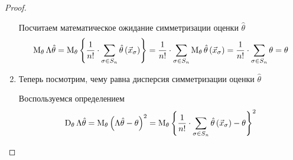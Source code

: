\begin{proof}
\begin{enumerate}
      Посчитаем математическое ожидание симметризации оценки $\hat{\theta}$
      \begin{align*}
        \operatorname{M}_{\theta} \Lambda\hat{\theta}
        = \operatorname{M}_{\theta} \left\{\frac{1}{n!}\cdot \sum_{\sigma\in S_n}
          \hat{\theta}\left( \vec{x}_{\sigma} \right)\right\}
        = \frac{1}{n!} \cdot \sum_{\sigma \in S_n}
          \operatorname{M}_{\theta} \hat{\theta}
            \left( \vec{x}_{\sigma} \right)
        = \frac{1}{n!} \cdot \sum_{\sigma \in S_n} \theta
        = \theta
      \end{align*}
      \begin{comment}
      Помним, что математическое ожидание линейно и
      константы можно выносить за знак математического ожидания,
      а математическое ожидание суммы равно сумме математических ожиданий
      \begin{align*}
          \meanof{\theta}{\left\{\frac{1}{n!}\cdot \sum_{\sigma\in S_n}
        \hat{\theta}\left(\vec{x}_\sigma\right)\right\}}
        = \frac{1}{n!}\cdot \sum_{\sigma\in S_n}
            \meanof{\theta}{\hat{\theta}\left(\vec{x}_\sigma\right)}
      \end{align*}

      Не забываем, что математическое ожидание
      $\hat{\theta}\left( \vec{x}_{\sigma} \right)$ равно параметру
      $\theta$

      \begin{align*}
          \frac{1}{n!}\cdot \sum_{\sigma\in S_n}
        \meanof{\theta}{\hat{\theta}\left(\vec{x}_\sigma\right)}
        = \frac{1}{n!}\cdot \sum_{\sigma\in S_n}\theta
      \end{align*}

      Сумма имеет $n!$ слагаемых (количество перестановок $\sigma\in S_n$)
      \begin{align*}
          \frac{1}{n!}\cdot \sum_{\sigma\in S_n}\theta
        = \frac{1}{n!}\cdot n!\cdot \theta
        = \theta
      \end{align*}

      А это значит, что первый пункт доказан и симметризация
      несмещённой оценки $\hat{\theta}$ действительно несмещённая
      $$\meanof{\theta}{\Lambda\hat{\theta}}= \theta$$
      \end{comment}
    \item
      Теперь посмотрим, чему равна дисперсия симметризации
      оценки $\hat{\theta}$

      Воспользуемся определением
      \begin{align*}
          \operatorname{D}_{\theta} \Lambda\hat{\theta}
        = \operatorname{M}_{\theta} 
            \left(\Lambda\hat{\theta}-\theta\right)^2
        = \operatorname{M}_{\theta} 
            \left\{\frac{1}{n!}\cdot \sum_{\sigma\in S_n}
        \hat{\theta}\left(\vec{x}_\sigma\right)
        -\theta\right\}^2
      \end{align*}


\end{enumerate}
\end{proof}
